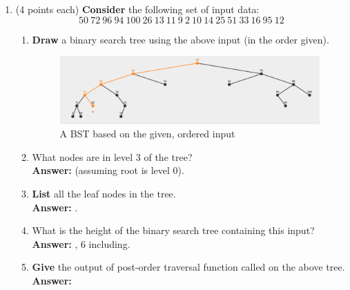 \documentclass[12pt, a4paper]{article}
\newcommand{\squeezeup}{\vspace{-16pt}}%
\begin{document}
\begin{enumerate}
    \newpage



    \item (4 points each) \textbf{Consider} the following set of input data:
    \begin{equation*}
        50\ 72\ 96\ 94\ 100\ 26\ 13\ 11\ 9\ 2\ 10\ 14\ 25\ 51\ 33\ 16\ 95\ 12
    \end{equation*}
    
    \begin{enumerate}

        \item \textbf{Draw} a binary search tree using the above input (in the order given).
        \begin{figure}[H]
            \includegraphics[max width=\textwidth/2, center]{"6(a).png"}
            \caption{A BST based on the given, ordered input}
            \label{fig:6(a)-BST}
        \end{figure}\squeezeup
    
        \item What nodes are in level 3 of the tree? \\
        \hspace*{\fill} \textbf{Answer:}  (assuming root is level 0).
        
        \item \textbf{List} all the leaf nodes in the tree. \\
        \hspace*{\fill} \textbf{Answer:} .
        
        \item What is the height of the binary search tree containing this input? \\
        \hspace*{\fill} \textbf{Answer:} , 6 including.
        
        \item \textbf{Give} the output of post-order traversal function called on the above tree. \\
        \hspace*{\fill} \textbf{Answer:} 
        

\end{enumerate}
\end{enumerate}
\end{document}
